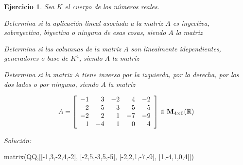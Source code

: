 \documentclass[12pt]{amsart}
\newtheorem{ejer}{Ejercicio}
\begin{document}
\begin{ejer} Sea $K$ el cuerpo de los n\'umeros reales.
\newline
\noindent\begin{minipage}{\textwidth}
\begin{tcolorbox}[colback = green!20!white,title=Versión Aplicaciones]
Determina si la aplicaci\'on lineal asociada a la matriz $A$ es inyectiva, sobreyectiva, biyectiva o ninguna de esas cosas, siendo $A$ la matriz \end{tcolorbox}
\end{minipage} \newline
\noindent\begin{minipage}{\textwidth}
\begin{tcolorbox}[colback = blue!20!white,title=Versión Vectores]
Determina si las columnas de la matriz $A$ son linealmente idependientes, generadores o base de $K^{4}$, siendo $A$ la matriz \end{tcolorbox}
\end{minipage} \newline
\noindent\begin{minipage}{\textwidth} 
\begin{tcolorbox}[colback = red!20!white,title=Versión Inversas]
Determina si la matriz $A$ tiene inversa por la izquierda, por la derecha, por los dos lados o por ninguno, siendo $A$ la matriz 
\end{tcolorbox}
\end{minipage}
\[ A = \left[\begin{array}{rrrrr}
-1 & 3 & -2 & 4 & -2 \\
-2 & 5 & -3 & 5 & -5 \\
-2 & 2 & 1 & -7 & -9 \\
1 & -4 & 1 & 0 & 4
\end{array}\right] \in {\bf M}_{4\times 5}({\mathbb R})\]
\end{ejer}

{\it Soluci\'on:}

\begin{sageblock}
matrix(QQ,[[-1,3,-2,4,-2],
[-2,5,-3,5,-5],
[-2,2,1,-7,-9],
[1,-4,1,0,4]])
\end{sageblock}

\end{document}

